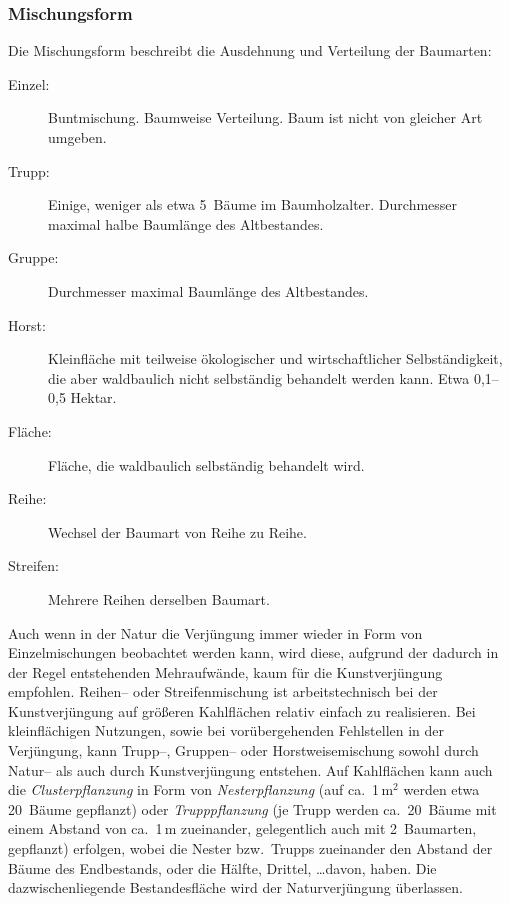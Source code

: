 \documentclass[twocolumn]{scrartcl}
\begin{document}
\subsubsection{Mischungsform}
\label{sssec:mischungsform}

Die Mischungsform beschreibt die Ausdehnung und Verteilung der
Baumarten:

\begin{description}
\item[Einzel:] Buntmischung. Baumweise Verteilung. Baum ist nicht von gleicher Art umgeben.
\item[Trupp:] Einige, weniger als etwa 5~Bäume im Baumholzalter. Durchmesser maximal halbe Baumlänge des Altbestandes.
\item[Gruppe:] Durchmesser maximal Baumlänge des Altbestandes.
\item[Horst:] Kleinfläche mit teilweise ökologischer und wirtschaftlicher Selbständigkeit, die aber waldbaulich nicht selbständig behandelt werden kann. Etwa 0,1--0,5 Hektar.
\item[Fläche:] Fläche, die waldbaulich selbständig behandelt wird.
\item[Reihe:] Wechsel der Baumart von Reihe zu Reihe.
\item[Streifen:] Mehrere Reihen derselben Baumart.
\end{description}

Auch wenn in der Natur die Verjüngung immer wieder in Form von Einzelmischungen
beobachtet werden kann, wird diese, aufgrund der dadurch in der Regel
entstehenden Mehraufwände, kaum für die Kunstverjüngung empfohlen. Reihen-- oder
Streifenmischung ist arbeitstechnisch bei der Kunstverjüngung auf größeren
Kahlflächen relativ einfach zu realisieren. Bei kleinflächigen Nutzungen, sowie
bei vorübergehenden Fehlstellen in der Verjüngung, kann Trupp--, Gruppen-- oder
Horstweisemischung sowohl durch Natur-- als auch durch Kunstverjüngung
entstehen. Auf Kahlflächen kann auch die \emph{Clusterpflanzung} in Form von
\emph{Nesterpflanzung} (auf ca.\ 1\,m$^2$ werden etwa 20~Bäume gepflanzt) oder
\emph{Trupppflanzung} (je Trupp werden ca.\ 20~Bäume mit einem Abstand von ca.\
1\,m zueinander, gelegentlich auch mit 2~Baumarten, gepflanzt) erfolgen, wobei
die Nester bzw.\ Trupps zueinander den Abstand der Bäume des Endbestands, oder
die Hälfte, Drittel, \dots davon, haben. Die dazwischenliegende Bestandesfläche
wird der Naturverjüngung überlassen.
\end{document}
